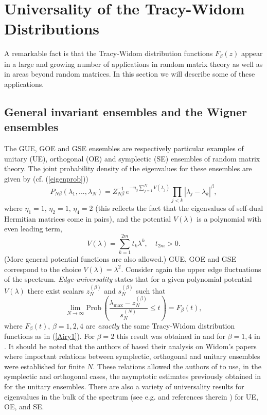 \documentclass[11pt,letterpaper,reqno]{amsart}
\theoremstyle{definition}
\theoremstyle{remark}
\numberwithin{equation}{section}
\begin{document}
\section{Universality of the Tracy-Widom Distributions}
A remarkable fact is that the Tracy-Widom distribution functions
$F_{\beta}(z)$ appear in a large and  growing number of applications in
random matrix theory as well as in areas beyond
 random matrices.  In this section we will describe
some of these applications.

\subsection{General invariant ensembles and the  Wigner ensembles}
The GUE, GOE and GSE ensembles are respectively particular examples of   unitary  (UE),
orthogonal (OE) and symplectic (SE) ensembles   of random matrix theory.
The joint probability density
of the eigenvalues for these ensembles are given by  (cf. (\ref{eigenprob}))
\begin{equation}\label{eigenprob1}
P_{N \beta}(\lambda_1, ..., \lambda_N) =
Z^{-1}_{N\beta}\,e^{-\eta_{\beta}\sum_{j=1}^{N}V(\lambda_j)}
\prod_{j<k}|\lambda_j - \lambda_k|^{\beta},
\end{equation}
where $\eta_{1}=1$, $\eta_{2} = 1$, $\eta_4 = 2$ (this reflects the fact that the eigenvalues of self-dual Hermitian
matrices come in pairs), and the potential $V(\lambda)$ is a polynomial
with even leading term,
\begin{equation}\label{vgen}
V(\lambda) = \sum_{k=1}^{2m}t_k\lambda^k, \quad t_{2m} > 0.
\end{equation}
(More general potential functions are also allowed.) GUE, GOE and GSE correspond
to the choice $V(\lambda) = \lambda^2$.  Consider again
the upper edge fluctuations of the  spectrum.  {\it Edge-universality}
states that
for a given polynomial potential $V(\lambda)$ there exist scalars   $z_N^{(\beta)}$ and $s_{N}^{(\beta)}$ such that
\begin{equation}\label{betaedge}
\lim_{N\to \infty}\textrm{Prob}\,\left(\frac{\lambda_{\textrm{max}} -z^{(\beta)}_N}{s^{(N)}_{N}}
\leq t\right) = F_{\beta}(t),
\end{equation}
where $F_{\beta}(t)$, $\beta = 1, 2, 4$ are  {\it exactly} the same Tracy-Widom distribution functions
as in (\ref{Airy1}). For $\beta = 2$ this result was obtained  in \cite{DKMVZ1,DKMVZ2} and for $\beta= 1, 4$
in  \cite{DeiGio1,DeiGio2}. It should be noted that the authors  of \cite{DeiGio1,DeiGio2}
based their analysis on Widom's papers \cite{95,96} where  important relations between
symplectic, orthogonal and unitary ensembles were established for finite $N$. These
relations allowed the authors of   \cite{DeiGio1,DeiGio2} to use, in the
symplectic and orthogonal cases, the
asymptotic estimates previously obtained in \cite{DKMVZ2} for the unitary ensembles.
There are also a variety of universality results for eigenvalues in the bulk of the spectrum
(see e.g.  \cite{deift2} and references therein ) for UE, OE, and SE.
\end{document}
